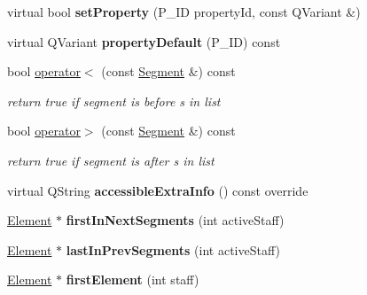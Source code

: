 \begin{DoxyCompactItemize}
virtual bool {\bfseries set\+Property} (P\+\_\+\+ID property\+Id, const Q\+Variant \&)
\item 
\mbox{\label{class_ms_1_1_segment_aae34263946980266d7023bc5670efdb4}} 
virtual Q\+Variant {\bfseries property\+Default} (P\+\_\+\+ID) const
\item 
\mbox{\label{class_ms_1_1_segment_a295db77c0cf520508dfbcc4497e2f738}} 
bool \hyperlink{class_ms_1_1_segment_a295db77c0cf520508dfbcc4497e2f738}{operator$<$} (const \hyperlink{class_ms_1_1_segment}{Segment} \&) const
\begin{DoxyCompactList}\small\item\em return true if segment is before s in list \end{DoxyCompactList}\item 
\mbox{\label{class_ms_1_1_segment_a6082182541496137b8aaac46b4806c06}} 
bool \hyperlink{class_ms_1_1_segment_a6082182541496137b8aaac46b4806c06}{operator$>$} (const \hyperlink{class_ms_1_1_segment}{Segment} \&) const
\begin{DoxyCompactList}\small\item\em return true if segment is after s in list \end{DoxyCompactList}\item 
\mbox{\label{class_ms_1_1_segment_ac98288a9025052069406783d2b093990}} 
virtual Q\+String {\bfseries accessible\+Extra\+Info} () const override
\item 
\mbox{\label{class_ms_1_1_segment_a32879f300d7f9b4031c5aa64c8323119}} 
\hyperlink{class_ms_1_1_element}{Element} $\ast$ {\bfseries first\+In\+Next\+Segments} (int active\+Staff)
\item 
\mbox{\label{class_ms_1_1_segment_afec9ec067383f911d6f625039e8b8fc2}} 
\hyperlink{class_ms_1_1_element}{Element} $\ast$ {\bfseries last\+In\+Prev\+Segments} (int active\+Staff)
\item 
\mbox{\label{class_ms_1_1_segment_a65e06ebd3e6b0af2fdde6e9125626ac9}} 
\hyperlink{class_ms_1_1_element}{Element} $\ast$ {\bfseries first\+Element} (int staff)
\item 

\end{DoxyCompactItemize}
